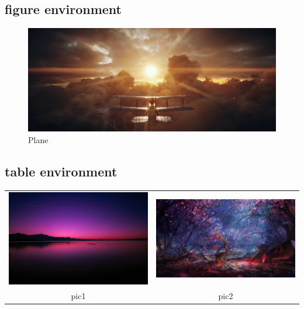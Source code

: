 \documentclass[14pt]{article}
\begin{document}
    \subsection{figure environment}
    \begin{figure}[h]
        \centering
        \includegraphics[scale=0.04]{images/wallpaperflare.com_wallpaper (6).jpg}
        \caption{Plane}
        \label{fig:freedom}
    \end{figure}

    \subsection{table environment}
    \begin{table}[h]
        \centering
        \begin{tabular}{c c}
            \includegraphics[scale=0.05]{images/wallpaper.jpg} & \includegraphics[scale=0.05]{images/wallpaperflare.com_wallpaper (2).jpg} \\
            pic1 & pic2\\
        \end{tabular}
    \end{table}
\end{document}
